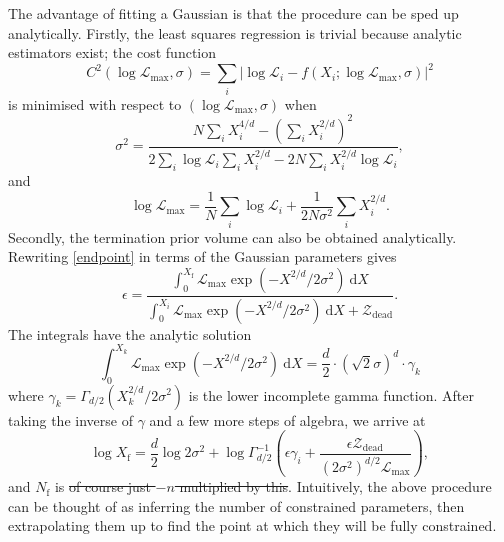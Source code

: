 \documentclass[usenatbib]{mnras}
\newcommand{\Like}{\mathcal{L}}
\newcommand{\logLmax}{\log \Like_\mathrm{max}}
\providecommand{\DIFaddtex}[1]{{\protect\color{blue}\uwave{#1}}} %
\providecommand{\DIFdeltex}[1]{{\protect\color{red}\sout{#1}}}                      %
\providecommand{\DIFaddbegin}{} %
\providecommand{\DIFaddend}{} %
\providecommand{\DIFdelbegin}{} %
\providecommand{\DIFdelend}{} %
\providecommand{\DIFadd}[1]{\texorpdfstring{\DIFaddtex{#1}}{#1}} %
\providecommand{\DIFdel}[1]{\texorpdfstring{\DIFdeltex{#1}}{}} %
\newcommand{\DIFscaledelfig}{0.5}
\newlength{\DIFdelgraphicswidth} %
\newlength{\DIFdelgraphicsheight} %
\newcommand{\DIFaddincludegraphics}[2][]{{\color{blue}\fbox{\DIFOincludegraphics[#1]{#2}}}} %
\newcommand{\DIFdelincludegraphics}[2][]{%
\sbox{\DIFdelgraphicsbox}{\DIFOincludegraphics[#1]{#2}}%
\settoboxwidth{\DIFdelgraphicswidth}{\DIFdelgraphicsbox} %
\settoboxtotalheight{\DIFdelgraphicsheight}{\DIFdelgraphicsbox} %
\scalebox{\DIFscaledelfig}{%
\parbox[b]{\DIFdelgraphicswidth}{\usebox{\DIFdelgraphicsbox}\\[-\baselineskip] \rule{\DIFdelgraphicswidth}{0em}}\llap{\resizebox{\DIFdelgraphicswidth}{\DIFdelgraphicsheight}{%
\setlength{\unitlength}{\DIFdelgraphicswidth}%
\begin{picture}(1,1)%
\thicklines\linethickness{2pt} %
{\color[rgb]{1,0,0}\put(0,0){\framebox(1,1){}}}%
{\color[rgb]{1,0,0}\put(0,0){\line( 1,1){1}}}%
{\color[rgb]{1,0,0}\put(0,1){\line(1,-1){1}}}%
\end{picture}%
}\hspace*{3pt}}} %
} %
\DeclareRobustCommand{\DIFaddbegin}{\DIFOaddbegin \let\includegraphics\DIFaddincludegraphics} %
\DeclareRobustCommand{\DIFaddend}{\DIFOaddend \let\includegraphics\DIFOincludegraphics} %
\DeclareRobustCommand{\DIFdelbegin}{\DIFOdelbegin \let\includegraphics\DIFdelincludegraphics} %
\DeclareRobustCommand{\DIFdelend}{\DIFOaddend \let\includegraphics\DIFOincludegraphics} %
\begin{document}
The advantage of fitting a Gaussian is that the procedure can be sped up analytically. Firstly, the least squares regression is trivial because analytic estimators exist; the cost function 
\begin{equation}\label{chi squared}
	C^2(\logLmax, \sigma) = \sum_i \left| \log \Like_i - f(X_i; \logLmax, \sigma) \right| ^2
\end{equation}
is minimised with respect to $(\logLmax, \sigma)$ when
\begin{equation}\label{eq:sigma}
    \sigma^2 = \frac{N \sum_i X_i^{4/d} - \left(\sum_i X_i^{2/d}\right)^2}{2 \sum_i \log \Like_i \sum_i X_i^{2/d} - 2N \sum_i X_i^{2/d}\log \Like_i },
\end{equation}
and
\begin{equation}\label{eq:logLmax}
    \logLmax = \frac{1}{N} \sum_i \log \mathcal{L}_i + \frac{1}{2N\sigma^2} \sum_i X_i^{2/d}.
\end{equation}
Secondly, the termination prior volume can also be obtained analytically. Rewriting \cref{endpoint} in terms of the Gaussian parameters gives
\begin{equation}
	\epsilon = \frac{\int_0^{X_\mathrm{f}} \Like_\mathrm{max} \exp\left(-X^{2/d}/2\sigma^2\right)\ \mathrm{d}X}{\int_0^{X_i} \Like_\mathrm{max} \exp\left(-X^{2/d}/2\sigma^2\right)\ \mathrm{d}X + \mathcal{Z}_\mathrm{dead}}.
\end{equation}
The integrals have the analytic solution
\begin{equation}
	\int_0^{X_k} \Like_\mathrm{max} \exp\left(-X^{2/d}/2\sigma^2\right)\ \mathrm{d}X = \frac{d}{2} \cdot \left(\sqrt{2}\sigma\right)^d \cdot \gamma_k
\end{equation}
where $\gamma_k = \Gamma_{d/2}\left(X_k^{2/d}/2\sigma^2\right)$ is the lower incomplete gamma function. After taking the inverse of  $\gamma$ and a few more steps of algebra, we arrive at
\begin{equation}
    \log X_\mathrm{f} = \frac{d}{2}\log 2\sigma^2	+ \log \Gamma^{-1}_{d/2} \left(\epsilon \gamma_i+ \frac{\epsilon\mathcal{Z}_\mathrm{dead}}{ \left( 2\sigma^2 \right)^{d/2}\Like_\mathrm{max}}\right),\label{eq:xf}
\end{equation}
and $N_\mathrm{f}$ is \DIFdelbegin \DIFdel{of course just $-n$ multiplied by this}\DIFdelend \DIFaddbegin \DIFadd{then computed with \mbox{%
\cref{eq:Nf}}\hspace{0pt}%
}\DIFaddend . Intuitively, the above procedure can be thought of as inferring the number of constrained parameters, then extrapolating them up to find the point at which they will be fully constrained. 
\end{document}
